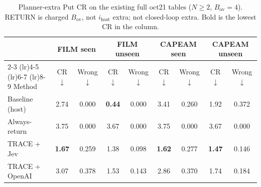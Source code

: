 \begin{table}[t]
\centering
\caption{Planner-extra Put CR on the existing full oct21 tables ($N\ge 2$, $B_{\mathrm{ov}}{=}4$).
RETURN is charged $B_{\mathrm{ov}}$, not $i_{\mathrm{host}}$ extra; not closed-loop extra.
Bold is the lowest CR in the column.}
\label{tab:putcr}
\scriptsize
\setlength{\tabcolsep}{3pt}
\begin{tabular}{lcccccccc}
\toprule
& \multicolumn{2}{c}{FILM seen} & \multicolumn{2}{c}{FILM unseen} & \multicolumn{2}{c}{CAPEAM seen} & \multicolumn{2}{c}{CAPEAM unseen} \\
\cmidrule(lr){2-3} \cmidrule(lr){4-5} \cmidrule(lr){6-7} \cmidrule(lr){8-9}
Method & CR$\downarrow$ & Wrong$\downarrow$ & CR$\downarrow$ & Wrong$\downarrow$ & CR$\downarrow$ & Wrong$\downarrow$ & CR$\downarrow$ & Wrong$\downarrow$ \\
\midrule
Baseline (host) & 2.74 & 0.000 & \textbf{0.44} & 0.000 & 3.41 & 0.260 & 1.92 & 0.372 \\
Always-return & 3.75 & 0.000 & 3.67 & 0.000 & 3.75 & 0.000 & 3.67 & 0.000 \\
TRACE + Jev & \textbf{1.67} & 0.259 & 1.38 & 0.098 & \textbf{1.62} & 0.277 & \textbf{1.47} & 0.146 \\
TRACE + OpenAI & 3.07 & 0.378 & 1.53 & 0.143 & 2.86 & 0.370 & 1.74 & 0.184 \\
\bottomrule
\end{tabular}
\end{table}
